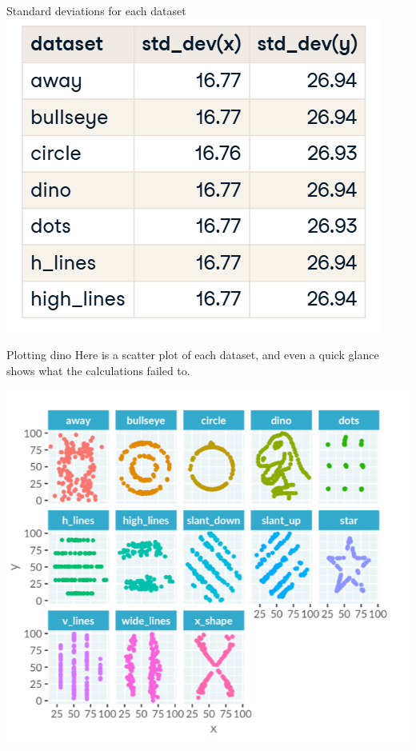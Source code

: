 \documentclass[
  ignorenonframetext,
]{beamer}
\begin{document}
\begin{frame}{Standard deviations for each dataset}
\label{standard-deviations-for-each-dataset-1}
\includegraphics{../images/im4.png}
\end{frame}

\begin{frame}{Plotting dino}
\label{plotting-dino}
Here is a scatter plot of each dataset, and even a quick glance shows
what the calculations failed to.

\includegraphics{../images/im5.png}
\end{frame}
\end{document}
